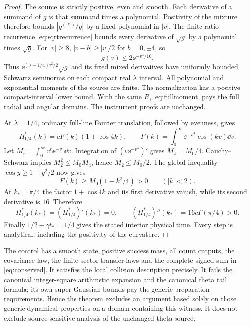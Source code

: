 \begin{proof}
The source is strictly positive, even and smooth. Each derivative of a
summand of $g$ is that summand times a polynomial. Positivity of the mixture
therefore bounds $|g^{(\ell)}/g|$ by a fixed polynomial in $|v|$.
The finite ratio recurrence \eqref{eq:sqrtrecurrence} bounds every derivative
of $\sqrt g$ by a polynomial times $\sqrt g$. For $|v|\ge8$,
$|v-b|\ge|v|/2$ for $b=0,\pm4$, so
\begin{equation}\label{eq:controltail}
 g(v)\le2\ee^{-v^4/16}.
\end{equation}
Thus $\ee^{(\lambda-1/4)v^2/2}\sqrt g$ and its fixed mixed derivatives
have uniformly bounded Schwartz seminorms on each compact real $\lambda$
interval. All polynomial and exponential moments of the source are finite.
The normalization has a positive compact-interval lower bound.
With the same $R$, \eqref{eq:fullmoment} pays the full radial and angular
domains. The instrument proofs are unchanged.

At $\lambda=1/4$, ordinary full-line Fourier translation, followed by
evenness, gives
\begin{equation}\label{eq:controlfactor}
 H^*_{1/4}(k)=cF(k)(1+\cos4k),\qquad
 F(k)=\int_0^\infty\ee^{-v^4}\cos(kv)\dd v.
\end{equation}
Let $M_r=\int_0^\infty v^r\ee^{-v^4}\dd v$.
Integration of $(v\ee^{-v^4})'$ gives $M_4=M_0/4$.
Cauchy--Schwarz implies $M_2^2\le M_0M_4$, hence $M_2\le M_0/2$.
The global inequality $\cos y\ge1-y^2/2$ now gives
\begin{equation}\label{eq:Fpositive}
 F(k)\ge M_0(1-k^2/4)>0\qquad(|k|<2).
\end{equation}
At $k_*=\pi/4$ the factor $1+\cos4k$ and its first derivative vanish,
while its second derivative is $16$. Therefore
\begin{equation}\label{eq:controlcollision}
 H^*_{1/4}(k_*)=(H^*_{1/4})'(k_*)=0,\qquad
 (H^*_{1/4})''(k_*)=16cF(\pi/4)>0.
\end{equation}
Finally $1/2-\gamma t_*=1/4$ gives the stated interior physical time.
Every step is analytical, including the positivity of the curvature.
\end{proof}

The control has a smooth state, positive success mass, all count outputs,
the covariance law, the finite-sector transfer laws and the complete signed
sum in \eqref{eq:conserved}. It satisfies the local collision description
precisely. It fails the canonical integer-square arithmetic expansion and
the canonical theta tail formula; its own super-Gaussian bounds pay the
generic preparation requirements. Hence the theorem excludes an argument
based solely on those generic dynamical properties on a domain containing
this witness. It does not exclude source-sensitive analysis of the unchanged
theta source.

